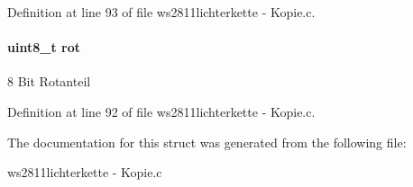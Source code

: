 Definition at line 93 of file ws2811lichterkette -\/ Kopie.\+c.

\hypertarget{structfarbe24bit_ad60cbe58e4e297fd42c0891c4fc2d290}{}
\paragraph[{rot}]{\setlength{\rightskip}{0pt plus 5cm}uint8\+\_\+t rot}\label{structfarbe24bit_ad60cbe58e4e297fd42c0891c4fc2d290}
8 Bit Rotanteil 

Definition at line 92 of file ws2811lichterkette -\/ Kopie.\+c.



The documentation for this struct was generated from the following file\+:\begin{DoxyCompactItemize}
\item 
ws2811lichterkette -\/ Kopie.\+c\end{DoxyCompactItemize}
